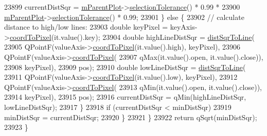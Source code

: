 \begin{DoxyCode}
23899         currentDistSqr = \hyperlink{class_q_c_p_layerable_aa2a528433e44db02b8aef23c1f9f90ed}{mParentPlot}->\hyperlink{class_q_custom_plot_a7b738074c75e80070ef6a10263c6cd69}{selectionTolerance}() * 0.99 *
23900                          \hyperlink{class_q_c_p_layerable_aa2a528433e44db02b8aef23c1f9f90ed}{mParentPlot}->\hyperlink{class_q_custom_plot_a7b738074c75e80070ef6a10263c6cd69}{selectionTolerance}() * 0.99;
23901       \} \textcolor{keywordflow}{else} \{
23902         \textcolor{comment}{// calculate distance to high/low lines:}
23903         \textcolor{keywordtype}{double} keyPixel = keyAxis->\hyperlink{class_q_c_p_axis_a985ae693b842fb0422b4390fe36d299a}{coordToPixel}(it.value().key);
23904         \textcolor{keywordtype}{double} highLineDistSqr = \hyperlink{class_q_c_p_abstract_plottable_a5ea1cab44ca912dcdc96ed81ec5bed5d}{distSqrToLine}(
23905             QPointF(valueAxis->\hyperlink{class_q_c_p_axis_a985ae693b842fb0422b4390fe36d299a}{coordToPixel}(it.value().high), keyPixel),
23906             QPointF(valueAxis->\hyperlink{class_q_c_p_axis_a985ae693b842fb0422b4390fe36d299a}{coordToPixel}(
23907                         qMax(it.value().open, it.value().close)),
23908                     keyPixel),
23909             pos);
23910         \textcolor{keywordtype}{double} lowLineDistSqr = \hyperlink{class_q_c_p_abstract_plottable_a5ea1cab44ca912dcdc96ed81ec5bed5d}{distSqrToLine}(
23911             QPointF(valueAxis->\hyperlink{class_q_c_p_axis_a985ae693b842fb0422b4390fe36d299a}{coordToPixel}(it.value().low), keyPixel),
23912             QPointF(valueAxis->\hyperlink{class_q_c_p_axis_a985ae693b842fb0422b4390fe36d299a}{coordToPixel}(
23913                         qMin(it.value().open, it.value().close)),
23914                     keyPixel),
23915             pos);
23916         currentDistSqr = qMin(highLineDistSqr, lowLineDistSqr);
23917       \}
23918       \textcolor{keywordflow}{if} (currentDistSqr < minDistSqr)
23919         minDistSqr = currentDistSqr;
23920     \}
23921   \}
23922   \textcolor{keywordflow}{return} qSqrt(minDistSqr);
23923 \}
\end{DoxyCode}


